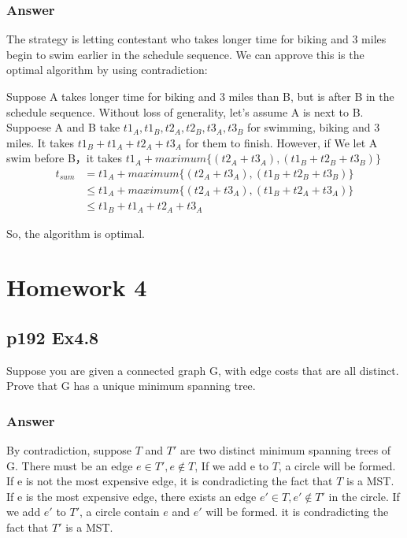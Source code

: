 \documentclass[a4paper]{article}
\begin{document}
\subsubsection*{Answer}
The strategy is letting contestant who takes longer time for biking and 3 miles begin to swim earlier in the schedule sequence. We can approve this is the optimal algorithm by using contradiction:
\par Suppose A takes longer time for biking and 3 miles than B, but is after B in the schedule sequence. Without loss of generality, let's assume A is next to B. Suppoese A and B take $t1_A, t1_B, t2_A, t2_B, t3_A, t3_B$ for swimming, biking and 3 miles. It takes $t1_B + t1_A + t2_A + t3_A$ for them to finish. However, if We let A swim before B，it takes $t1_A + maximum\{(t2_A+t3_A), (t1_B+t2_B+t3_B)\}$
\begin{equation}
	\begin{aligned}
		t_{sum} & = t1_A + maximum\{(t2_A+t3_A), (t1_B+t2_B+t3_B)\}    \\
		        & \leq t1_A + maximum\{(t2_A+t3_A), (t1_B+t2_A+t3_A)\} \\
		        & \leq t1_B + t1_A + t2_A + t3_A
	\end{aligned}
\end{equation}
\par So, the algorithm is optimal.

\newpage
\section*{Homework 4}
\subsection*{p192 Ex4.8}
\begin{adjustwidth}{1cm}{1cm}
	Suppose you are given a connected graph G, with edge costs that are all
	distinct. Prove that G has a unique minimum spanning tree.
\end{adjustwidth}

\subsubsection*{Answer}
By contradiction, suppose $T$ and $T'$ are two distinct minimum spanning trees of G. There must be an edge $e \in T', e\notin T$, If we add e to $T$, a circle will be formed. If e is not the most expensive edge, it is condradicting the fact that $T$ is a MST. If e is the most expensive edge, there exists an edge $e'\in T, e'\notin T'$ in the circle. If we add $e'$ to $T'$, a circle contain $e$ and $e'$ will be formed. it is condradicting the fact that $T'$ is a MST.
\vspace{2cm}
\end{document}
